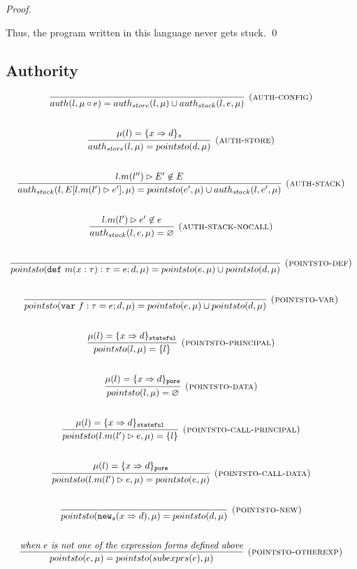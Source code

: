 \documentclass{llncs}
\newcommand{\keywadj}[1]{\mathtt{#1}}
\newcommand{\keyw}[1]{\keywadj{#1}~}
\begin{document}
\begin{proof}
\begin{pcases}
\end{pcases}

\noindent Thus, the program written in this language never gets stuck. \qed

\end{proof}

\newpage

\subsection{Authority}

\[
\begin{array}{c}
\infer[\textsc{(auth-config)}]
  {auth(l,\mu \circ e) = auth_{store}(l,\mu) \cup auth_{stack}(l,e,\mu)}
  {}\\[5ex]

\infer[\textsc{(auth-store)}]
  {auth_{store}(l,\mu) = pointsto(d,\mu)}
  {\mu(l) = \{ x \Rightarrow d \}_{s}}\\[5ex]
  
\infer[\textsc{(auth-stack)}]
  {auth_{stack}(l,E[l.m(l') \rhd e'],\mu) = pointsto(e',\mu) \cup auth_{stack}(l,e',\mu)}
  {l.m(l'') \rhd E' \not\in E}\\[5ex]
  
\infer[\textsc{(auth-stack-nocall)}]
  {auth_{stack}(l,e,\mu) = \varnothing}
  {l.m(l') \rhd e' \not\in e}\\[5ex]
  
\infer[\textsc{(pointsto-def)}]
  {pointsto(\keyw{def} m(x:\tau):\tau = e; d,\mu) = pointsto(e,\mu) \cup pointsto(d,\mu)}
  {}\\[5ex]
  
\infer[\textsc{(pointsto-var)}]
  {pointsto(\keyw{var} f:\tau = e; d,\mu) = pointsto(e,\mu) \cup pointsto(d,\mu)}
  {}\\[5ex]
  
\infer[\textsc{(pointsto-principal)}]
  {pointsto(l,\mu) = \{ l \}}
  {\mu(l) = \{ x \Rightarrow d \}_\keywadj{stateful}}\\[5ex]
  
\infer[\textsc{(pointsto-data)}]
  {pointsto(l,\mu) = \varnothing }
  {\mu(l) = \{ x \Rightarrow d \}_\keywadj{pure}}\\[5ex]

\infer[\textsc{(pointsto-call-principal)}]
  {pointsto(l.m(l') \rhd e,\mu) = \{l\} }
  {\mu(l) = \{ x \Rightarrow d \}_\keywadj{stateful}}\\[5ex]
  
\infer[\textsc{(pointsto-call-data)}]
  {pointsto(l.m(l') \rhd e,\mu) = pointsto(e,\mu)}
  {\mu(l) = \{ x \Rightarrow d \}_\keywadj{pure}}\\[5ex]
  
\infer[\textsc{(pointsto-new)}]
  {pointsto(\keywadj{new}_{s}(x \Rightarrow d),\mu) = pointsto(d,\mu) }
  {}\\[5ex]
  
\infer[\textsc{(pointsto-otherexp)}]
  {pointsto(e,\mu) = pointsto(subexprs(e),\mu) }
  {\textit{when $e$ is not one of the expression forms defined above}}\\[5ex]

\end{array}
\]
\end{document}
